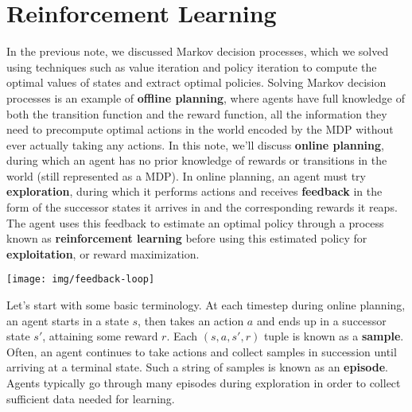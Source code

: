 \documentclass[11pt,fleqn]{article}
\def\title{Note \the\lecturenumber}
\begin{document}
\maketitle


\iffalse
\documentclass[11pt,fleqn]{article}
\usepackage{latexsym,epsf,amsmath,amsfonts,graphicx,url}

\title{Note 5}

\newcommand{\F}{\mathbb{F}}
\newcommand{\Z}{\mathbb{Z}}
\newcommand{\Q}{\mathbb{Q}}
\newcommand{\R}{\mathbb{R}}
\newcommand{\C}{\mathbb{C}}

\begin{document}

\maketitle
\fi

\section*{Reinforcement Learning}
In the previous note, we discussed Markov decision processes, which we solved using techniques such as value iteration and policy iteration to compute the optimal values of states and extract optimal policies. Solving Markov decision processes is an example of \textbf{offline planning}, where agents have full knowledge of both the transition function and the reward function, all the information they need to precompute optimal actions in the world encoded by the MDP without ever actually taking any actions. In this note, we'll discuss \textbf{online planning}, during which an agent has no prior knowledge of rewards or transitions in the world (still represented as a MDP). In online planning, an agent must try \textbf{exploration}, during which it performs actions and receives \textbf{feedback} in the form of the successor states it arrives in and the corresponding rewards it reaps. The agent uses this feedback to estimate an optimal policy through a process known as \textbf{reinforcement learning} before using this estimated policy for \textbf{exploitation}, or reward maximization.
\begin{center}	
	\texttt{[image: img/feedback-loop]}
\end{center}
Let's start with some basic terminology. At each timestep during online planning, an agent starts in a state $s$, then takes an action $a$ and ends up in a successor state $s'$, attaining some reward $r$. Each $(s, a, s', r)$ tuple is known as a \textbf{sample}. Often, an agent continues to take actions and collect samples in succession until arriving at a terminal state. Such a string of samples is known as an \textbf{episode}. Agents typically go through many episodes during exploration in order to collect sufficient data needed for learning.


\end{document}
\end{document}
